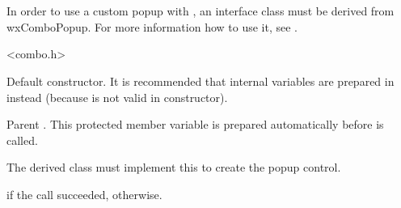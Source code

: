 
\section{}\label{wxcombopopup}

In order to use a custom popup with ,
an interface class must be derived from wxComboPopup. For more information
how to use it, see .


<combo.h>





\label{wxcombopopupwxcombopopup}


Default constructor. It is recommended that internal variables
are prepared in  instead
(because  is not valid in constructor).


\label{wxcombopopupmcombo}


Parent . This protected member variable is
prepared automatically before  is called.


\label{wxcombopopupcreate}


The derived class must implement this to create the popup control.


\true if the call succeeded, \false otherwise.


\label{wxcombopopupdismiss}

